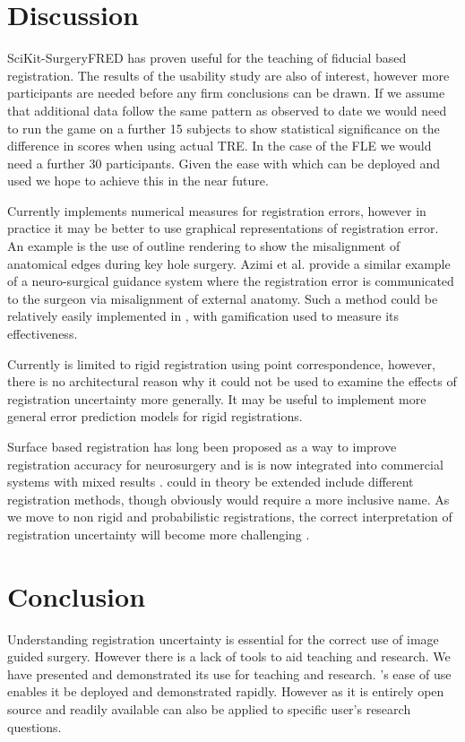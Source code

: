 \section{Discussion}
SciKit-SurgeryFRED has proven useful for the teaching of fiducial based registration.
The results of the usability study 
are also of interest, however more participants are needed before any firm conclusions
can be drawn.
If we assume that additional data follow the same pattern as observed to date we
would need to run the game on a further 15 subjects to show statistical significance
on the difference in scores when using actual \gls{TRE}. In the case of the
\gls{FLE} we would need a further 30 participants. Given the ease with
which \fred can be deployed and used we hope to achieve this in the near future.

Currently \fred implements numerical measures for registration errors, however
in practice it may be better to use
graphical representations of registration error. An example is the use of
outline rendering to show the misalignment of anatomical edges during key hole 
surgery\cite{PMID:29663273}. Azimi et al. \cite{10.1007/978-3-030-59716-0_7} 
provide a similar example of a neuro-surgical guidance system where the 
registration error is communicated to the surgeon via misalignment of 
external anatomy. Such a method could be relatively easily implemented in \fredns, with
gamification used to measure its effectiveness. 

Currently \fred is limited to rigid registration using point correspondence, however, 
there is no architectural reason why it could not be used to examine the 
effects of registration uncertainty more generally. It may be useful to implement 
more general error prediction models for rigid registrations\cite{4359072,5629373}.

Surface based registration has long been proposed as a way to improve 
registration accuracy for neurosurgery \cite{736031} and is 
is now integrated into commercial systems with mixed results \cite{mongen2020}.
\fred could in 
theory be extended include different registration methods, though obviously would 
require a more inclusive name. As we move to non rigid and 
probabilistic registrations, the correct interpretation of registration 
uncertainty will become more challenging \cite{10.1007/978-3-030-59716-0_26}.

\section{Conclusion}
Understanding registration uncertainty is essential for the correct 
use of image guided surgery. However there is a lack of tools to 
aid teaching and research.
We have presented \fred and demonstrated its use for teaching and research. 
\fredns's ease of use enables it be deployed and demonstrated rapidly. However as
it is entirely open source and readily available \fred can also be applied to 
specific user's research questions. 




